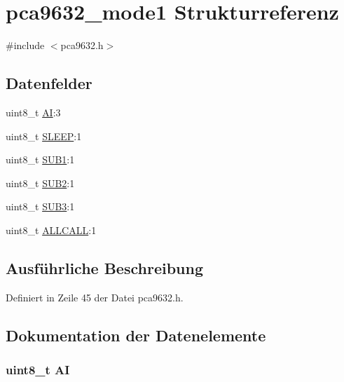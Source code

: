 \hypertarget{structpca9632__mode1}{}\section{pca9632\+\_\+mode1 Strukturreferenz}
\label{structpca9632__mode1}


{\ttfamily \#include $<$pca9632.\+h$>$}

\subsection*{Datenfelder}
\begin{DoxyCompactItemize}
\item 
uint8\+\_\+t \hyperlink{structpca9632__mode1_a8782eaf4d6ff8b39d2ef058050c8a0e3}{A\+I}\+:3
\item 
uint8\+\_\+t \hyperlink{structpca9632__mode1_a05c807e11fc79c83555f4ffa9c615931}{S\+L\+E\+E\+P}\+:1
\item 
uint8\+\_\+t \hyperlink{structpca9632__mode1_ac083d3b48e6031d3d2f8ad9364979f8a}{S\+U\+B1}\+:1
\item 
uint8\+\_\+t \hyperlink{structpca9632__mode1_af120064ca23de43baa710af2e393a464}{S\+U\+B2}\+:1
\item 
uint8\+\_\+t \hyperlink{structpca9632__mode1_aec6e2f987b736f08d04b1e2026450a33}{S\+U\+B3}\+:1
\item 
uint8\+\_\+t \hyperlink{structpca9632__mode1_a3b132e9bc22066a1b609998caba7f94c}{A\+L\+L\+C\+A\+L\+L}\+:1
\end{DoxyCompactItemize}


\subsection{Ausführliche Beschreibung}


Definiert in Zeile 45 der Datei pca9632.\+h.



\subsection{Dokumentation der Datenelemente}
\hypertarget{structpca9632__mode1_a8782eaf4d6ff8b39d2ef058050c8a0e3}{}
\subsubsection[{A\+I}]{\setlength{\rightskip}{0pt plus 5cm}uint8\+\_\+t A\+I}\label{structpca9632__mode1_a8782eaf4d6ff8b39d2ef058050c8a0e3}



